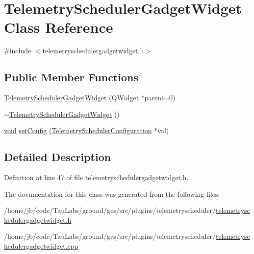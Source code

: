 \hypertarget{class_telemetry_scheduler_gadget_widget}{\section{\-Telemetry\-Scheduler\-Gadget\-Widget \-Class \-Reference}
\label{class_telemetry_scheduler_gadget_widget}
}


{\ttfamily \#include $<$telemetryschedulergadgetwidget.\-h$>$}

\subsection*{\-Public \-Member \-Functions}
\begin{DoxyCompactItemize}
\item 
\hyperlink{group___telemetry_scheduler_gadget_plugin_gaa1033c34c3bb84642fb5c9096c2689ab}{\-Telemetry\-Scheduler\-Gadget\-Widget} (\-Q\-Widget $\ast$parent=0)
\item 
\hyperlink{group___telemetry_scheduler_gadget_plugin_gae6a59d9c688634b35de1e64c3ad1e4e7}{$\sim$\-Telemetry\-Scheduler\-Gadget\-Widget} ()
\item 
\hyperlink{group___u_a_v_objects_plugin_ga444cf2ff3f0ecbe028adce838d373f5c}{void} \hyperlink{group___telemetry_scheduler_gadget_plugin_gad90b204c2dc0fef1a0c92b94c324808a}{set\-Config} (\hyperlink{class_telemetry_scheduler_configuration}{\-Telemetry\-Scheduler\-Configuration} $\ast$val)
\end{DoxyCompactItemize}


\subsection{\-Detailed \-Description}


\-Definition at line 47 of file telemetryschedulergadgetwidget.\-h.



\-The documentation for this class was generated from the following files\-:\begin{DoxyCompactItemize}
\item 
/home/jb/code/\-Tau\-Labs/ground/gcs/src/plugins/telemetryscheduler/\hyperlink{telemetryschedulergadgetwidget_8h}{telemetryschedulergadgetwidget.\-h}\item 
/home/jb/code/\-Tau\-Labs/ground/gcs/src/plugins/telemetryscheduler/\hyperlink{telemetryschedulergadgetwidget_8cpp}{telemetryschedulergadgetwidget.\-cpp}\end{DoxyCompactItemize}
